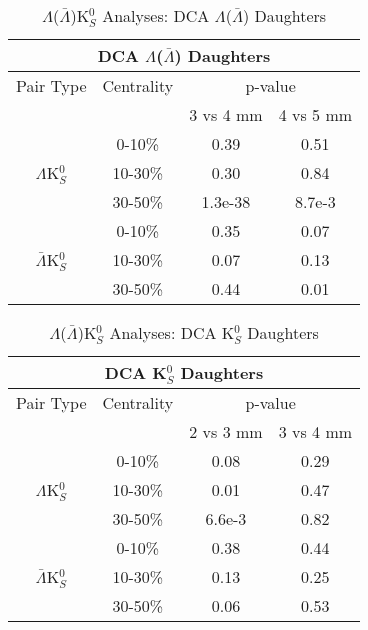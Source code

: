 \documentclass[../AnalysisNoteJBuxton.tex]{subfiles}
\begin{document}
\begin{table}
 \centering
 \begin{tabular}{|c|c|c|c|}
 \multicolumn{4}{c}{DCA $\Lambda$($\bar{\Lambda}$) Daughters} \\
  \hline
  Pair Type & Centrality & \multicolumn{2}{c|}{p-value} \\
  \cline{3-4}
   & & 3 vs 4 mm & 4 vs 5 mm \\
  \hline
   & 0-10\% & 0.39 & 0.51 \\
  $\Lambda$K$^{0}_{S}$ 
   & 10-30\% & 0.30 & 0.84 \\
   & 30-50\% & 1.3e-38 & 8.7e-3 \\
  \hline
   & 0-10\% & 0.35 & 0.07 \\
  $\bar{\Lambda}$K$^{0}_{S}$ 
   & 10-30\% & 0.07 & 0.13 \\
   & 30-50\% & 0.44 & 0.01 \\
  \hline
 \end{tabular}
 \caption{$\Lambda$($\bar{\Lambda}$)K$^{0}_{S}$ Analyses: DCA $\Lambda$($\bar{\Lambda}$) Daughters}
 \label{tab:LamDaughtersDcaLamK0}
\end{table}

\begin{table}
 \centering
 \begin{tabular}{|c|c|c|c|}
 \multicolumn{4}{c}{DCA K$^{0}_{S}$ Daughters} \\
  \hline
  Pair Type & Centrality & \multicolumn{2}{c|}{p-value} \\
  \cline{3-4}
   & & 2 vs 3 mm & 3 vs 4 mm \\
  \hline
   & 0-10\% & 0.08 & 0.29 \\
  $\Lambda$K$^{0}_{S}$ 
   & 10-30\% & 0.01 & 0.47 \\
   & 30-50\% & 6.6e-3 & 0.82 \\
  \hline
   & 0-10\% & 0.38 & 0.44 \\
  $\bar{\Lambda}$K$^{0}_{S}$ 
   & 10-30\% & 0.13 & 0.25 \\
   & 30-50\% & 0.06 & 0.53 \\
  \hline
 \end{tabular}
 \caption{$\Lambda$($\bar{\Lambda}$)K$^{0}_{S}$ Analyses: DCA K$^{0}_{S}$ Daughters}
 \label{tab:K0DaughtersDcaLamK0}
\end{table}
\end{document}
